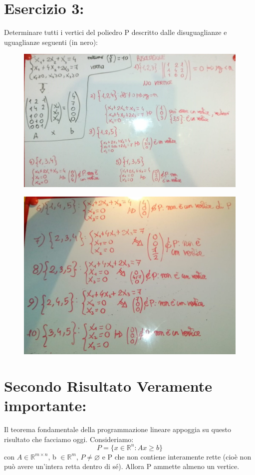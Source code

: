 \section{Esercizio 3:} Determinare tutti i vertici del poliedro P descritto dalle disuguaglianze e uguaglianze seguenti (in nero):
\begin{figure}[h!]
    \centering
    \includegraphics[scale=0.3]{esercizio3_1.jpeg}
\end{figure}
\begin{figure}[h!]
    \centering
    \includegraphics[scale=0.3]{esercizio3_2.jpeg}
\end{figure}



\newpage



\section{Secondo Risultato Veramente importante:} Il teorema fondamentale della programmazione lineare appoggia su questo risultato che facciamo oggi. Consideriamo:
\begin{equation*}
    P = \{x \in \mathbb{R}^n: Ax \geq b\}
\end{equation*}
con $A \in \mathbb{R}^{m \times n}$, b $\in \mathbb{R}^m$, $P \neq \varnothing$ e P che non contiene interamente rette (cioè non può avere un'intera retta dentro di sé). Allora P ammette almeno un vertice.

